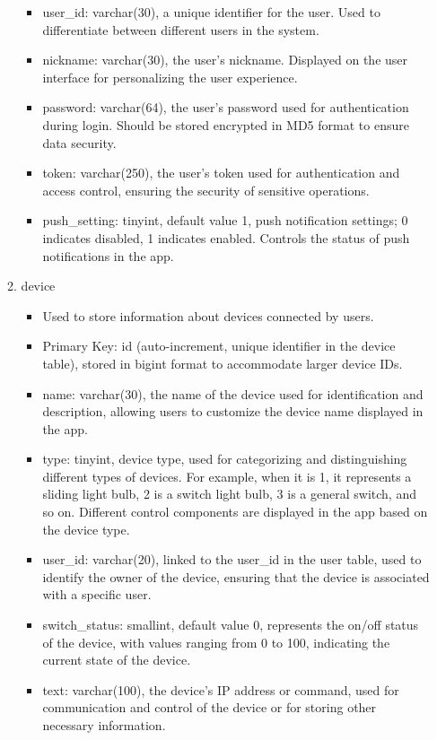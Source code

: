 \begin{enumerate}
\begin{enumerate}
\begin{itemize}
                        \item user\_id: varchar(30), a unique identifier for the user. Used to differentiate between different users in the system.
                        \item nickname: varchar(30), the user's nickname. Displayed on the user interface for personalizing the user experience.
                        \item password: varchar(64), the user's password used for authentication during login. Should be stored encrypted in MD5 format to ensure data security.
                        \item token: varchar(250), the user's token used for authentication and access control, ensuring the security of sensitive operations.
                        \item push\_setting: tinyint, default value 1, push notification settings; 0 indicates disabled, 1 indicates enabled. Controls the status of push notifications in the app.\\
                    \end{itemize}

              \item device
                    \begin{itemize}
                        \item Used to store information about devices connected by users.
                        \item Primary Key: id (auto-increment, unique identifier in the device table), stored in bigint format to accommodate larger device IDs.
                        \item name: varchar(30), the name of the device used for identification and description, allowing users to customize the device name displayed in the app.
                        \item type: tinyint, device type, used for categorizing and distinguishing different types of devices. For example, when it is 1, it represents a sliding light bulb, 2 is a switch light bulb, 3 is a general switch, and so on. Different control components are displayed in the app based on the device type.
                        \item user\_id: varchar(20), linked to the user\_id in the user table, used to identify the owner of the device, ensuring that the device is associated with a specific user.
                        \item switch\_status: smallint, default value 0, represents the on/off status of the device, with values ranging from 0 to 100, indicating the current state of the device.
                        \item text: varchar(100), the device's IP address or command, used for communication and control of the device or for storing other necessary information.\\
                    \end{itemize}


\end{enumerate}
\end{enumerate}
